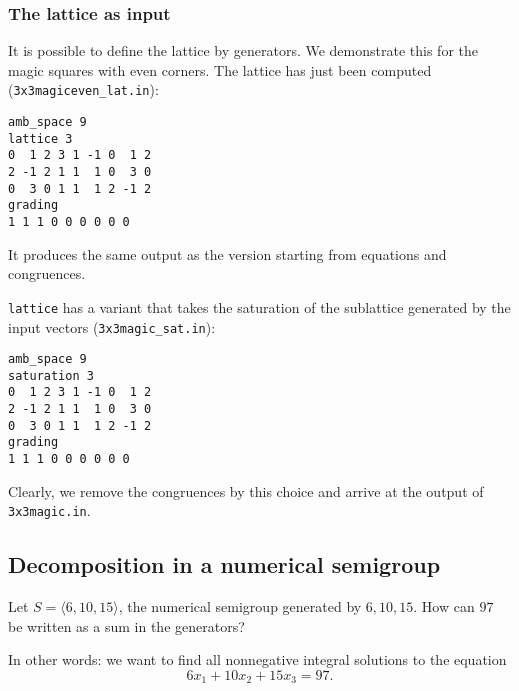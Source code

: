 \documentclass[12pt,a4paper]{scrartcl}
\theoremstyle{definition}
\begin{document}
\subsubsection{The lattice as input}\label{latt_ex}

It is possible to define the lattice by generators. We demonstrate this for the magic squares with even corners. The lattice has just been computed (\verb|3x3magiceven_lat.in|):

\begin{Verbatim}
amb_space 9
lattice 3
0  1 2 3 1 -1 0  1 2
2 -1 2 1 1  1 0  3 0
0  3 0 1 1  1 2 -1 2
grading
1 1 1 0 0 0 0 0 0
\end{Verbatim}
It produces the same output as the version starting from equations and congruences.

\verb|lattice| has a variant that takes the saturation of the sublattice generated by the input vectors (\verb|3x3magic_sat.in|):

\begin{Verbatim}
amb_space 9
saturation 3
0  1 2 3 1 -1 0  1 2
2 -1 2 1 1  1 0  3 0
0  3 0 1 1  1 2 -1 2
grading
1 1 1 0 0 0 0 0 0
\end{Verbatim}
Clearly, we remove the congruences by this choice and arrive at the output of \verb|3x3magic.in|.

\subsection{Decomposition in a numerical semigroup}\label{inhom_eq_ex}

Let $S=\langle 6,10,15\rangle$, the numerical semigroup generated by $6,10,15$. How can $97$ be written as a sum in the generators?\medskip

In other words: we want to find all nonnegative integral solutions to the equation
$$
6x_1+10x_2+15x_3=97.
$$
\end{document}
